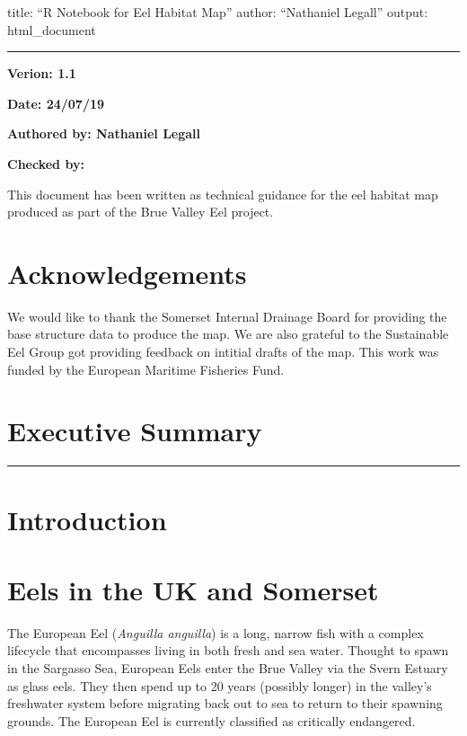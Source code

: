 \documentclass[]{article}
\title{}
\author{}
\date{}
\begin{document}
title: ``R Notebook for Eel Habitat Map'' author: ``Nathaniel Legall''
output: html\_document

\begin{center}\rule{0.5\linewidth}{\linethickness}\end{center}

\textbf{Verion: 1.1}

\textbf{Date: 24/07/19 }

\textbf{Authored by: Nathaniel Legall}

\textbf{Checked by: }

This document has been written as technical guidance for the eel habitat
map produced as part of the Brue Valley Eel project.

\hypertarget{acknowledgements}{%
\section{Acknowledgements}\label{acknowledgements}}

We would like to thank the Somerset Internal Drainage Board for
providing the base structure data to produce the map. We are also
grateful to the Sustainable Eel Group got providing feedback on intitial
drafts of the map. This work was funded by the European Maritime
Fisheries Fund.

\hypertarget{executive-summary}{%
\section{Executive Summary}\label{executive-summary}}

\begin{center}\rule{0.5\linewidth}{\linethickness}\end{center}

\hypertarget{introduction}{%
\section{Introduction}\label{introduction}}

\hypertarget{eels-in-the-uk-and-somerset}{%
\section{Eels in the UK and
Somerset}\label{eels-in-the-uk-and-somerset}}

The European Eel (\emph{Anguilla anguilla}) is a long, narrow fish with
a complex lifecycle that encompasses living in both fresh and sea water.
Thought to spawn in the Sargasso Sea, European Eels enter the Brue
Valley via the Svern Estuary as glass eels. They then spend up to 20
years (possibly longer) in the valley's freshwater system before
migrating back out to sea to return to their spawning grounds. The
European Eel is currently classified as critically endangered.
\end{document}
